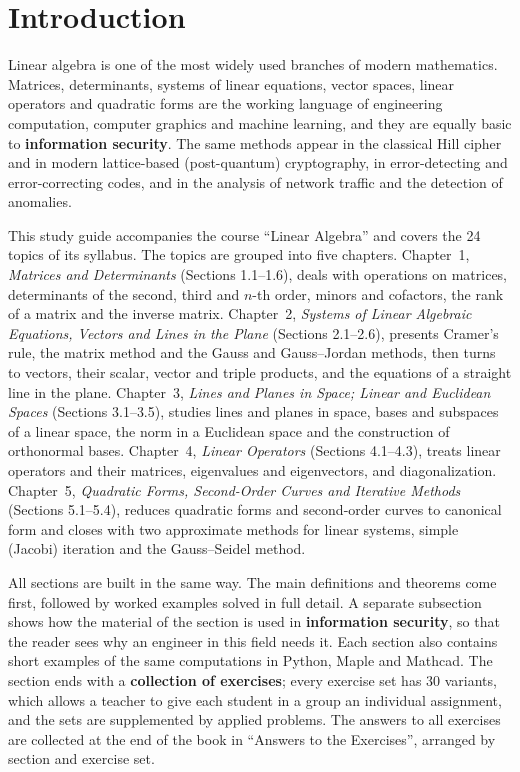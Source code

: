\chapter*{Introduction}

Linear algebra is one of the most widely used branches of modern
mathematics. Matrices, determinants, systems of linear equations, vector
spaces, linear operators and quadratic forms are the working language of
engineering computation, computer graphics and machine learning, and they
are equally basic to \textbf{information security}. The same methods appear
in the classical Hill cipher and in modern lattice-based (post-quantum)
cryptography, in error-detecting and error-correcting codes, and in the
analysis of network traffic and the detection of anomalies.

This study guide accompanies the course “Linear Algebra” and covers the
24 topics of its syllabus. The topics are grouped into five chapters.
Chapter~1, \emph{Matrices and Determinants} (Sections 1.1–1.6), deals with
operations on matrices, determinants of the second, third and $n$-th order,
minors and cofactors, the rank of a matrix and the inverse matrix.
Chapter~2, \emph{Systems of Linear Algebraic Equations, Vectors and Lines in
the Plane} (Sections 2.1–2.6), presents Cramer’s rule, the matrix method and
the Gauss and Gauss–Jordan methods, then turns to vectors, their scalar,
vector and triple products, and the equations of a straight line in the
plane. Chapter~3, \emph{Lines and Planes in Space; Linear and Euclidean
Spaces} (Sections 3.1–3.5), studies lines and planes in space, bases and
subspaces of a linear space, the norm in a Euclidean space and the
construction of orthonormal bases. Chapter~4, \emph{Linear Operators}
(Sections 4.1–4.3), treats linear operators and their matrices, eigenvalues
and eigenvectors, and diagonalization. Chapter~5, \emph{Quadratic Forms,
Second-Order Curves and Iterative Methods} (Sections 5.1–5.4), reduces
quadratic forms and second-order curves to canonical form and closes with
two approximate methods for linear systems, simple (Jacobi) iteration and
the Gauss–Seidel method.

All sections are built in the same way. The main definitions and theorems
come first, followed by worked examples solved in full detail. A separate
subsection shows how the material of the section is used in
\textbf{information security}, so that the reader sees why an engineer in
this field needs it. Each section also contains short examples of the same
computations in Python, Maple and Mathcad. The section ends with a
\textbf{collection of exercises}; every exercise set has 30 variants, which
allows a teacher to give each student in a group an individual assignment,
and the sets are supplemented by applied problems. The answers to all
exercises are collected at the end of the book in “Answers to the
Exercises”, arranged by section and exercise set.

